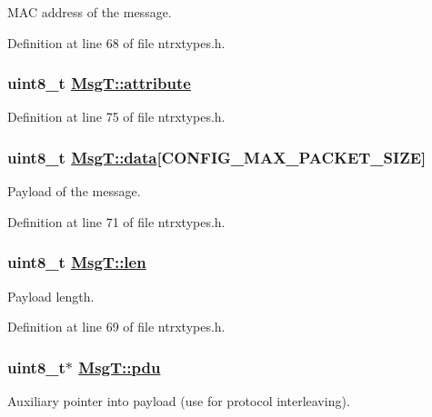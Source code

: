 MAC address of the message. 

Definition at line 68 of file ntrxtypes.h.\hypertarget{structMsgT_2490adcea73235248c0644d0f0d5617f}{
\subsubsection[attribute]{\setlength{\rightskip}{0pt plus 5cm}uint8\_\-t \hyperlink{structMsgT_2490adcea73235248c0644d0f0d5617f}{Msg\-T::attribute}}}
\label{structMsgT_2490adcea73235248c0644d0f0d5617f}




Definition at line 75 of file ntrxtypes.h.\hypertarget{structMsgT_cceb12b48d6e524a880c2c11d399b1b6}{
\subsubsection[data]{\setlength{\rightskip}{0pt plus 5cm}uint8\_\-t \hyperlink{structMsgT_cceb12b48d6e524a880c2c11d399b1b6}{Msg\-T::data}\mbox{[}CONFIG\_\-MAX\_\-PACKET\_\-SIZE\mbox{]}}}
\label{structMsgT_cceb12b48d6e524a880c2c11d399b1b6}


Payload of the message. 

Definition at line 71 of file ntrxtypes.h.\hypertarget{structMsgT_5edfff063e0b30b685cd4aa81dc04812}{
\subsubsection[len]{\setlength{\rightskip}{0pt plus 5cm}uint8\_\-t \hyperlink{structMsgT_5edfff063e0b30b685cd4aa81dc04812}{Msg\-T::len}}}
\label{structMsgT_5edfff063e0b30b685cd4aa81dc04812}


Payload length. 

Definition at line 69 of file ntrxtypes.h.\hypertarget{structMsgT_7c3e54fb06475cb6a34d09820d59eeb1}{
\subsubsection[pdu]{\setlength{\rightskip}{0pt plus 5cm}uint8\_\-t$\ast$ \hyperlink{structMsgT_7c3e54fb06475cb6a34d09820d59eeb1}{Msg\-T::pdu}}}
\label{structMsgT_7c3e54fb06475cb6a34d09820d59eeb1}


Auxiliary pointer into payload (use for protocol interleaving). 

